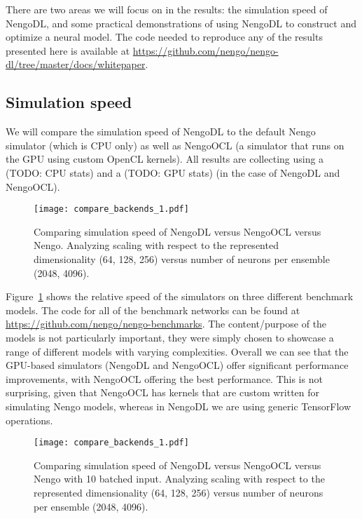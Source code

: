 \documentclass{article}
\begin{document}
There are two areas we will focus on in the results: the simulation speed of NengoDL, and some practical demonstrations of using NengoDL to construct and optimize a neural model.  The code needed to reproduce any of the results presented here is available at \url{https://github.com/nengo/nengo-dl/tree/master/docs/whitepaper}. 

\subsection{Simulation speed}

We will compare the simulation speed of NengoDL to the default Nengo simulator (which is CPU only) as well as NengoOCL (a simulator that runs on the GPU using custom OpenCL kernels).  All results are collecting using a (TODO: CPU stats) and a (TODO: GPU stats) (in the case of NengoDL and NengoOCL).

\begin{figure}
\centering
\texttt{[image: compare\_backends\_1.pdf]}
\caption{Comparing simulation speed of NengoDL versus NengoOCL versus Nengo.  Analyzing scaling with respect to the represented dimensionality (64, 128, 256) versus number of neurons per ensemble (2048, 4096).}
\label{fig:compare_backends_1}
\end{figure}

Figure~\ref{fig:compare_backends_1} shows the relative speed of the simulators on three different benchmark models.  The code for all of the benchmark networks can be found at \url{https://github.com/nengo/nengo-benchmarks}.  The content/purpose of the models is not particularly important, they were simply chosen to showcase a range of different models with varying complexities.  Overall we can see that the GPU-based simulators (NengoDL and NengoOCL) offer significant performance improvements, with NengoOCL offering the best performance.  This is not surprising, given that NengoOCL has kernels that are custom written for simulating Nengo models, whereas in NengoDL we are using generic TensorFlow operations.

\begin{figure}
\centering
\texttt{[image: compare\_backends\_1.pdf]}
\caption{Comparing simulation speed of NengoDL versus NengoOCL versus Nengo with 10 batched input.  Analyzing scaling with respect to the represented dimensionality (64, 128, 256) versus number of neurons per ensemble (2048, 4096).}
\label{fig:compare_backends_10}
\end{figure}
\end{document}
